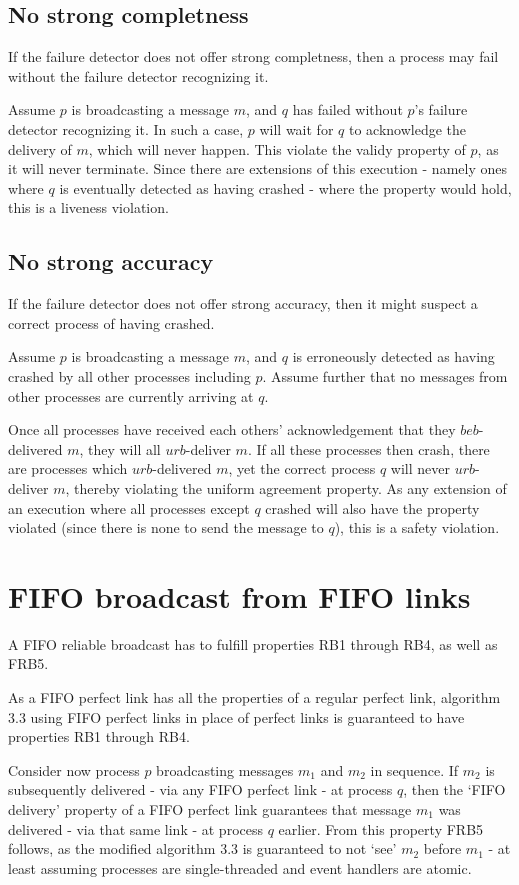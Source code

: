 \documentclass[a4paper]{scrreprt}
\begin{document}
\subsection{No strong completness}

If the failure detector does not offer strong completness, then a process may
fail without the failure detector recognizing it.

Assume $p$ is broadcasting a message $m$, and $q$ has failed without $p$'s
failure detector recognizing it. In such a case, $p$ will wait for $q$ to
acknowledge the delivery of $m$, which will never happen. This violate the
validy property of $p$, as it will never terminate. Since there are extensions
of this execution - namely ones where $q$ is eventually detected as having
crashed - where the property would hold, this is a liveness violation.

\subsection{No strong accuracy}

If the failure detector does not offer strong accuracy, then it might suspect a
correct process of having crashed.

Assume $p$ is broadcasting a message $m$, and $q$ is erroneously detected as
having crashed by all other processes including $p$. Assume further that no
messages from other processes are currently arriving at $q$.

Once all processes have received each others' acknowledgement that they
$beb$-delivered $m$, they will all $urb$-deliver $m$. If all these processes
then crash, there are processes which $urb$-delivered $m$, yet the correct
process $q$ will never $urb$-deliver $m$, thereby violating the uniform
agreement property. As any extension of an execution where all processes except
$q$ crashed will also have the property violated (since there is none to send
the message to $q$), this is a safety violation.

\section{FIFO broadcast from FIFO links}

A FIFO reliable broadcast has to fulfill properties RB1 through RB4, as well as
FRB5.

As a FIFO perfect link has all the properties of a regular perfect link,
algorithm 3.3 using FIFO perfect links in place of perfect links is guaranteed
to have properties RB1 through RB4.

Consider now process $p$ broadcasting messages $m_1$ and $m_2$ in sequence. If
$m_2$ is subsequently delivered - via any FIFO perfect link - at process $q$,
then the `FIFO delivery' property of a FIFO perfect link guarantees that
message $m_1$ was delivered - via that same link - at process $q$ earlier. From
this property FRB5 follows, as the modified algorithm 3.3 is guaranteed to not
`see' $m_2$ before $m_1$ - at least assuming processes are single-threaded and
event handlers are atomic.
\end{document}
